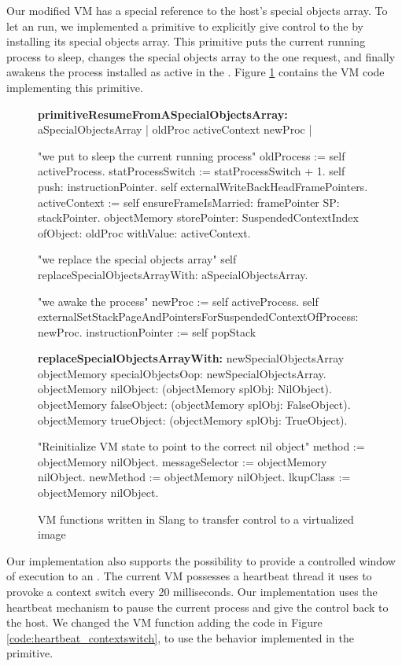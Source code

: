 Our modified VM has a special reference to the host's special objects array. To let an \objectspace run, we implemented a primitive to explicitly give control to the \objectspace by installing its special objects array. This primitive puts the current running process to sleep, changes the special objects array to the one request, and finally awakens the process installed as active in the \objectspace. Figure \ref{code:switch_to_objectspace} contains the VM code implementing this primitive.

\begin{figure}[htb]
\begin{code}
\textbf{primitiveResumeFromASpecialObjectsArray:}
                                                        aSpecialObjectsArray
    | oldProc activeContext  newProc |

    "we put to sleep the current running process"
    oldProcess := self activeProcess.
    statProcessSwitch := statProcessSwitch + 1.
    self push: instructionPointer.
    self externalWriteBackHeadFramePointers.
    activeContext := self
        ensureFrameIsMarried: framePointer
        SP: stackPointer.
    objectMemory
        storePointer: SuspendedContextIndex
        ofObject: oldProc
        withValue: activeContext.
	
    "we replace the special objects array"
    self replaceSpecialObjectsArrayWith: aSpecialObjectsArray.
	
    "we awake the process"
    newProc := self activeProcess.
    self externalSetStackPageAndPointersForSuspendedContextOfProcess: newProc.
    instructionPointer := self popStack

\textbf{replaceSpecialObjectsArrayWith:} newSpecialObjectsArray
    objectMemory specialObjectsOop: newSpecialObjectsArray.
    objectMemory nilObject:
             (objectMemory splObj: NilObject).
    objectMemory falseObject: 
             (objectMemory splObj: FalseObject).
    objectMemory trueObject:
             (objectMemory splObj: TrueObject).

    "Reinitialize VM state to point to the correct nil object"	
    method := objectMemory nilObject.
    messageSelector := objectMemory nilObject.
    newMethod := objectMemory nilObject.
    lkupClass := objectMemory nilObject.
\end{code}
\caption{VM functions written in Slang to transfer control to a virtualized image
\label{code:switch_to_objectspace}}
\end{figure}

Our implementation also supports the possibility to provide a controlled window of execution to an \objectspace. The current VM possesses a heartbeat thread it uses to provoke a context switch every 20 milliseconds. Our implementation uses the heartbeat mechanism to pause the current \objectspace process and give the control back to the host. We changed the VM function \textbf{} adding the code in Figure \ref{code:heartbeat_contextswitch}, to use the behavior implemented in the  primitive.

